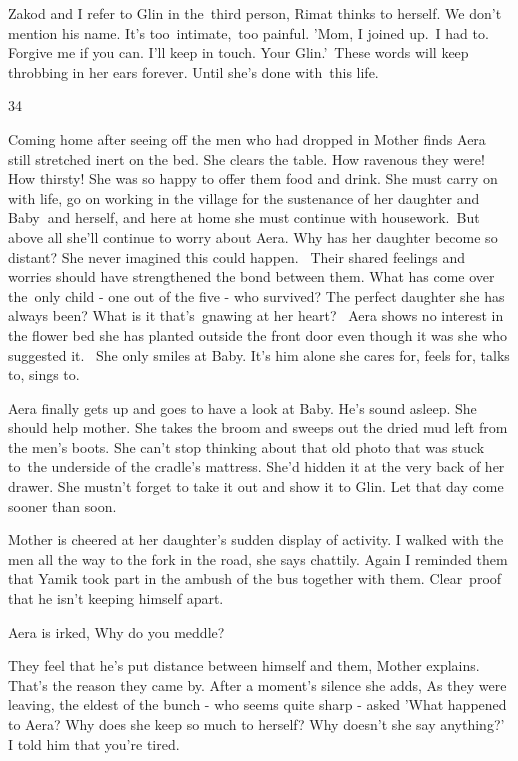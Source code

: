 \documentclass[twoside,11pt]{book}
\begin{document}
Zakod and I refer to Glin in the\ third person, Rimat thinks to herself. We don't mention his name. It{}'s
too\ intimate,~too painful. {}'Mom, I joined up.\ I had to. Forgive me if you can. I{}'ll keep in touch. Your
Glin.{}'\ These words will keep throbbing in her ears forever. Until she{}'s done with\ this life.


\bigskip

34 \ 

Coming home after seeing off the men who had dropped in Mother finds Aera still stretched inert on the bed. She clears
the table. How ravenous they were! How thirsty! She was so happy to offer them food and drink. She must carry on with
life, go on working in the village for the sustenance of her daughter and Baby\textbf{\ }and herself, and here at home
she must continue with housework.{\ }But above all she'll continue to worry about Aera. Why has her
daughter become so distant? She never imagined this could happen. ~Their shared feelings and worries should have
strengthened the bond between them. What has come over the~only child - one out of the five - who survived? The perfect
daughter she has always been? What is it that's~gnawing at her heart? ~Aera shows no interest in the flower bed she has
planted outside the front door even though it was she who suggested it. ~She only smiles at Baby. It's him alone she
cares for, feels for, talks to, sings to.\ 

Aera finally gets up and goes to have a look at Baby. He's sound asleep. She should help mother. She takes the broom and
sweeps out the dried mud left from the men's boots. She can't stop thinking about that old photo that was stuck
to{\ }the underside of the cradle's mattress. She'd hidden it at the very back of her drawer. She
mustn't forget to take it out and show it to Glin. Let that day come sooner than soon. 

Mother is cheered at her daughter's sudden display of activity. {\textquotedbl}I walked with the men all the way to the
fork in the road,{\textquotedbl} she says chattily. {\textquotedbl}Again I reminded them that Yamik took part in the
ambush of the bus together with them.  Clear~proof that he isn't keeping himself apart.{\textquotedbl}

Aera is irked, {\textquotedbl}Why do you meddle?{\textquotedbl} 

{\textquotedbl}They feel that he{}'s put distance between himself and them,{\textquotedbl} Mother explains.
{\textquotedbl}That's the reason they came by.{\textquotedbl} After a moment's silence she adds, {\textquotedbl}As they
were leaving, the eldest of the bunch - who seems quite sharp - asked 'What happened to Aera? Why does she keep so much
to herself? Why doesn't she say anything?' I told him that you're tired.{\textquotedbl} 
\end{document}
